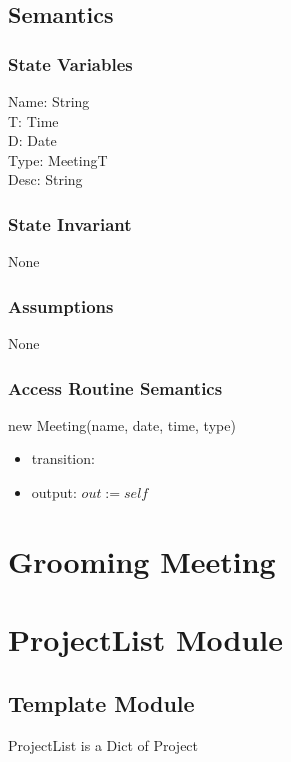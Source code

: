 \documentclass[12pt, titlepage]{article}
\begin{document}
\subsection* {Semantics}
\subsubsection* {State Variables}
Name: String\\
T: Time\\
D: Date\\
Type: MeetingT\\
Desc: String
\subsubsection* {State Invariant}

None

\subsubsection* {Assumptions}

None

\subsubsection* {Access Routine Semantics}
\noindent new Meeting(name, date, time, type)
\begin{itemize}
    \item transition: 
    \item output: $out := self$
\end{itemize}

\newpage

\section*{Grooming Meeting}
\subsection*{}

\newpage

\section* {ProjectList Module}
\subsection*{Template Module}
ProjectList is a Dict of Project
\end{document}
